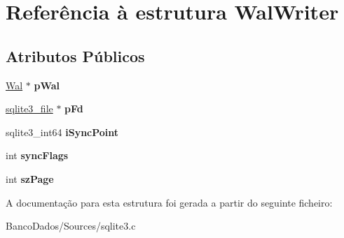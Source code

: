 \hypertarget{struct_wal_writer}{\section{Referência à estrutura Wal\-Writer}
\label{struct_wal_writer}
}
\subsection*{Atributos Públicos}
\begin{DoxyCompactItemize}
\item 
\hypertarget{struct_wal_writer_a3ed1cabab4a2f0572ec04d2a174e5bf9}{\hyperlink{struct_wal}{Wal} $\ast$ {\bfseries p\-Wal}}\label{struct_wal_writer_a3ed1cabab4a2f0572ec04d2a174e5bf9}

\item 
\hypertarget{struct_wal_writer_a0c98cddd084b97d9f531fa71b92ef40a}{\hyperlink{structsqlite3__file}{sqlite3\-\_\-file} $\ast$ {\bfseries p\-Fd}}\label{struct_wal_writer_a0c98cddd084b97d9f531fa71b92ef40a}

\item 
\hypertarget{struct_wal_writer_a1227aea1e12b6b409e8a7cdbae43588e}{sqlite3\-\_\-int64 {\bfseries i\-Sync\-Point}}\label{struct_wal_writer_a1227aea1e12b6b409e8a7cdbae43588e}

\item 
\hypertarget{struct_wal_writer_acc8dcbdc9b91bae4799b5de113742ae6}{int {\bfseries sync\-Flags}}\label{struct_wal_writer_acc8dcbdc9b91bae4799b5de113742ae6}

\item 
\hypertarget{struct_wal_writer_aa161832c97830aed52410747ebde5e6e}{int {\bfseries sz\-Page}}\label{struct_wal_writer_aa161832c97830aed52410747ebde5e6e}

\end{DoxyCompactItemize}


A documentação para esta estrutura foi gerada a partir do seguinte ficheiro\-:\begin{DoxyCompactItemize}
\item 
Banco\-Dados/\-Sources/sqlite3.\-c\end{DoxyCompactItemize}
